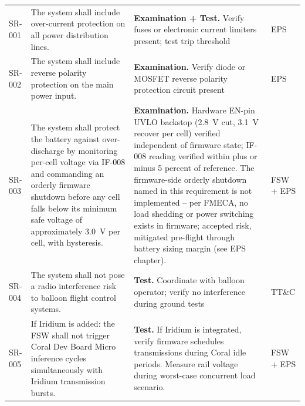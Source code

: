 \begin{landscape}
\begin{longtable}{p{1.4cm}p{8.2cm}p{10.2cm}p{1.9cm}}
SR-001 & The system shall include over-current protection on all power distribution lines. & \textbf{Examination + Test.} Verify fuses or electronic current limiters present; test trip threshold & EPS \\
SR-002 & The system shall include reverse polarity protection on the main power input. & \textbf{Examination.} Verify diode or MOSFET reverse polarity protection circuit present & EPS \\
SR-003 & The system shall protect the battery against over-discharge by monitoring per-cell voltage via IF-008 and commanding an orderly firmware shutdown before any cell falls below its minimum safe voltage of approximately 3.0~V per cell, with hysteresis. & \textbf{Examination.} Hardware EN-pin UVLO backstop (2.8~V cut, 3.1~V recover per cell) verified independent of firmware state; IF-008 reading verified within plus or minus 5 percent of reference. The firmware-side orderly shutdown named in this requirement is not implemented -- per FMECA, no load shedding or power switching exists in firmware; accepted risk, mitigated pre-flight through battery sizing margin (see EPS chapter). & FSW + EPS \\
SR-004 & The system shall not pose a radio interference risk to balloon flight control systems. & \textbf{Test.} Coordinate with balloon operator; verify no interference during ground tests & TT\&C \\
SR-005 & If Iridium is added: the FSW shall not trigger Coral Dev Board Micro inference cycles simultaneously with Iridium transmission bursts. & \textbf{Test.} If Iridium is integrated, verify firmware schedules transmissions during Coral idle periods. Measure rail voltage during worst-case concurrent load scenario. & FSW + EPS \\
\end{longtable}

\end{landscape}
